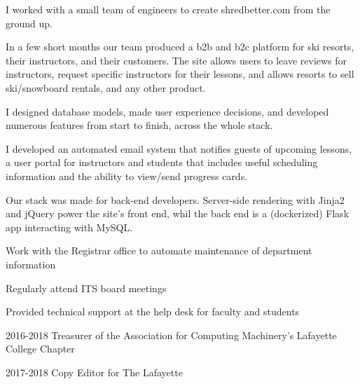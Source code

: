 \documentclass[letterpaper]{deedy-resume} %
\begin{document}
\begin{minipage}[t]{0.64\textwidth}
I worked with a small team of engineers to create shredbetter.com from the ground up.
\begin{tightitemize}
\item In a few short months our team produced a b2b and b2c platform for ski resorts, their instructors, and their customers. The site allows users to leave reviews for instructors, request specific instructors for their lessons, and allows resorts to sell ski/snowboard rentals, and any other product.
\item I designed database models, made user experience decisions, and developed numerous features from start to finish, across the whole stack. 
\item I developed an automated email system that notifies guests of upcoming lessons, a user portal for instructors and students that includes useful scheduling information and the ability to view/send progress cards.
\item Our stack was made for back-end developers. Server-side rendering with Jinja2 and jQuery power the site's front end, whil the back end is a (dockerized) Flask app interacting with MySQL.
\end{tightitemize}
\sectionspace
{}

\begin{tightitemize}
\item Work with the Registrar office to automate maintenance of department information
\item Regularly attend ITS board meetings
\item Provided technical support at the help desk for faculty and students
\end{tightitemize}
\sectionspace %



\sectionspace %



\begin{tightitemize}
\item 2016-2018 Treasurer of the Association for Computing Machinery's 
Lafayette College Chapter \\
\item 2017-2018 Copy Editor for The Lafayette 
\end{tightitemize}

\sectionspace
\end{minipage} %
\end{document}
